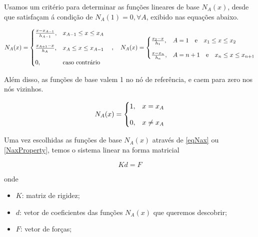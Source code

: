 \documentclass[12pt]{scrartcl}
\begin{document}
Usamos um critério para determinar as funções lineares de base $N_A(x)$, desde que satisfaçam á condição de $N_A(1) = 0, \forall A$,
exibido nas equações abaixo.

\begin{equation}\label{eqNax}
    N_A(x) =
    \begin{cases}
        \frac{x - x_{A-1}}{h_{A-1}}, & x_{A-1} \leq x \leq x_A   \\
        \noalign{\vskip9pt}
        \frac{x_{A+1} - x}{h_{A}},   & x_{A} \leq x \leq x_{A-1} \\
        \noalign{\vskip9pt}
        0,                           & \textrm{caso contrário}
    \end{cases}
    \quad , \quad
    N_A(x) =
    \begin{cases}
        \frac{x_2 - x}{h_1}, & A = 1 \quad \textrm{e} \quad x_{1} \leq x \leq x_2       \\
        \noalign{\vskip9pt}
        \frac{x - x_n}{h_n}, & A = n+1 \quad \textrm{e} \quad x_{n} \leq x \leq x_{n+1}
    \end{cases}
\end{equation}

Além disso, as funções de base valem 1 no nó de referência, e caem para zero nos nós vizinhos.

\begin{equation}\label{NaxProperty}
    N_A(x) = \begin{cases}
        1, & x = x_A    \\
        \noalign{\vskip9pt}
        0, & x \neq x_A \\
    \end{cases}
\end{equation}

Uma vez escolhidas as funções de base $N_A(x)$ através de \eqref{eqNax} ou \eqref{NaxProperty}, temos o sistema linear na forma matricial

\begin{equation}\label{eqkdf}
    Kd = F
\end{equation}

onde

\begin{itemize}
    \item $K$: matriz de rigidez;
    \item $d$: vetor de coeficientes das funções $N_A(x)$ que queremos descobrir;
    \item $F$: vetor de forças;
\end{itemize}
\end{document}
